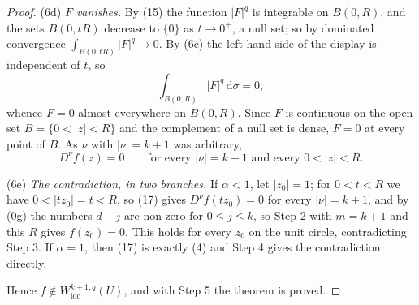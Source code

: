 \begin{proof}
\noindent(6d) \emph{$F$ vanishes.}  By (15) the function $|F|^{q}$ is integrable
on $B(0,R)$, and the sets $B(0,tR)$ decrease to $\{0\}$ as $t\to0^+$, a null
set; so by dominated convergence
$\int_{B(0,tR)}|F|^{q}\to0$.  By (6c) the left-hand side of the display is
independent of $t$, so
\[
  \int_{B(0,R)}|F|^{q}\,\mathrm{d}\sigma=0 ,
\]
whence $F=0$ almost everywhere on $B(0,R)$.  Since $F$ is continuous on the
open set $B=\{0<|z|<R\}$ and the complement of a null set is dense, $F=0$ at
every point of $B$.  As $\nu$ with $|\nu|=k+1$ was arbitrary,
\begin{equation}\tag{17}
  D^\nu f(z)=0\qquad\text{for every }|\nu|=k+1\text{ and every }0<|z|<R .
\end{equation}

\noindent(6e) \emph{The contradiction, in two branches.}  If $\alpha<1$, let
$|z_0|=1$; for $0<t<R$ we have $0<|tz_0|=t<R$, so (17) gives
$D^\nu f(tz_0)=0$ for every $|\nu|=k+1$, and by (0g) the numbers $d-j$ are
non-zero for $0\le j\le k$, so Step 2 with $m=k+1$ and this $R$ gives
$f(z_0)=0$.  This holds for every $z_0$ on the unit circle, contradicting
Step 3.  If $\alpha=1$, then (17) is exactly (4) and Step 4 gives the
contradiction directly.

Hence $f\notin W^{k+1,q}_{\mathrm{loc}}(U)$, and with Step 5 the theorem is
proved.
\end{proof}
